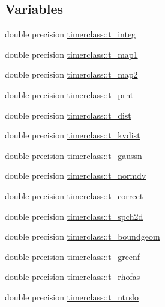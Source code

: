 \subsection*{Variables}
\begin{DoxyCompactItemize}
\item 
double precision \mbox{\hyperlink{namespacetimerclass_a27a1612019724dba83c6282789acd438}{timerclass\+::t\+\_\+integ}}
\item 
double precision \mbox{\hyperlink{namespacetimerclass_add1e5cdff404cd8526ae448ac2fb7f04}{timerclass\+::t\+\_\+map1}}
\item 
double precision \mbox{\hyperlink{namespacetimerclass_afedfbbf4bbafaa50343cdc8c6aa10f81}{timerclass\+::t\+\_\+map2}}
\item 
double precision \mbox{\hyperlink{namespacetimerclass_a46c757a554e9df6d4b0afaa3705277be}{timerclass\+::t\+\_\+prnt}}
\item 
double precision \mbox{\hyperlink{namespacetimerclass_a9b6b0481b5c71629a787a1e558afa8b0}{timerclass\+::t\+\_\+dist}}
\item 
double precision \mbox{\hyperlink{namespacetimerclass_ab4a25c76f5337ddbe92d696962d74b8f}{timerclass\+::t\+\_\+kvdist}}
\item 
double precision \mbox{\hyperlink{namespacetimerclass_a22ac90d37e89e2e290014ff2942f201d}{timerclass\+::t\+\_\+gaussn}}
\item 
double precision \mbox{\hyperlink{namespacetimerclass_a5540a93d3b5aaa9f4e565dcb6d9d51ca}{timerclass\+::t\+\_\+normdv}}
\item 
double precision \mbox{\hyperlink{namespacetimerclass_a6b31e88ecf075c6a84871dac40764766}{timerclass\+::t\+\_\+correct}}
\item 
double precision \mbox{\hyperlink{namespacetimerclass_a999480c13b7174ab484db8ca3b22e8c1}{timerclass\+::t\+\_\+spch2d}}
\item 
double precision \mbox{\hyperlink{namespacetimerclass_aa77a1d30c4b660cf6b3b63114d193793}{timerclass\+::t\+\_\+boundgeom}}
\item 
double precision \mbox{\hyperlink{namespacetimerclass_aa38ad4042a025f6277353cc66f212a87}{timerclass\+::t\+\_\+greenf}}
\item 
double precision \mbox{\hyperlink{namespacetimerclass_a90dda0e43d26c34adab1c014bf769b9a}{timerclass\+::t\+\_\+rhofas}}
\item 
double precision \mbox{\hyperlink{namespacetimerclass_add80bbd91dff017ed09673ec91b01b61}{timerclass\+::t\+\_\+ntrslo}}
\item 

\end{DoxyCompactItemize}
